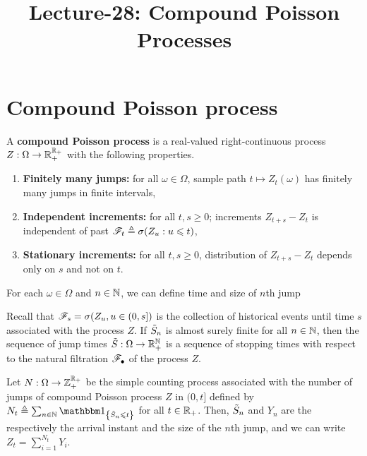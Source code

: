 \documentclass[a4paper,english,10pt]{article}
\title{Lecture-28: Compound Poisson Processes}
\author{}
\date{}
\begin{document}
\maketitle

\section{Compound Poisson process}
\begin{defn}
A \textbf{compound Poisson process} is a real-valued right-continuous process $Z:\Omega\to\mathbb{R}_+^{\mathbb{R}_+}$ with the following properties.
\begin{enumerate}[i\_]
	\item \textbf{Finitely many jumps:} for all $\omega \in \Omega$, sample path $t \mapsto Z_t(\omega)$ has finitely many jumps in finite intervals,
	\item \textbf{Independent increments:} for all $t,s \ge 0$; increments $Z_{t+s}-Z_t$ is independent of past $\mathscr{F}_t \triangleq \sigma(Z_u: u\leqslant t)$, 
	\item \textbf{Stationary increments:} for all $t,s \ge 0$, distribution of $Z_{t+s}-Z_t$ depends only on $s$ and not on $t$.
\end{enumerate}	
\end{defn}
\begin {defn}
For each $\omega \in \Omega$ and $n \in \mathbb{N}$, we can define time and size of $n$th jump
\end{defn}
\begin{rem}
Recall that $\mathscr{F}_s = \sigma(Z_u, u \in (0, s])$ is the collection of historical events until time $s$ 
associated with the process $Z$. 
If $\tilde{S}_n$ is almost surely finite for all $n \in \mathbb{N}$, 
then the sequence of jump times $\tilde{S}:\Omega\to\mathbb{R}_+^{\mathbb{N}}$ is a sequence of stopping times with respect to the natural filtration $\mathscr{F}_\bullet$ of the process $Z$. 
\end{rem}
\begin{rem}
Let $N:\Omega\to\mathbb{Z}_+^{\mathbb{R}_+}$ be the simple counting process associated with the number of jumps of compound Poisson process $Z$ in $(0,t]$ defined by $N_t \triangleq \sum_{n\in\N}\SetIn{\tS_n\le t}$ for all $t\in\mathbb{R}_+$. 
Then, $\tilde{S}_n$ and  $Y_n$ are the respectively the arrival instant and the size of the $n$th jump, 
and we can write $Z_t = \sum_{i = 1}^{N_t}Y_i$. 
\end{rem}
\end{document}
